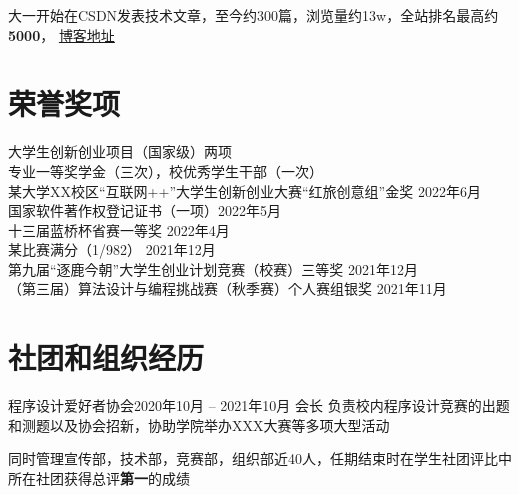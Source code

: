 \documentclass[a4paper]{article}
\begin{document}
{    大一开始在CSDN发表技术文章，至今约300篇，浏览量约13w，全站排名最高约\textbf{5000}， \href{https://blog.csdn.net}{博客地址}


\section{\textbf{荣誉奖项}}

    \textbullet 大学生创新创业项目（国家级）两项 \\
    \textbullet 专业一等奖学金（三次），校优秀学生干部（一次） \\
    \textbullet 某大学XX校区“互联网++”大学生创新创业大赛“红旅创意组”金奖 \hfill 2022年6月 \\
    \textbullet 国家软件著作权登记证书（一项）\hfill 2022年5月 \\
    \textbullet 十三届蓝桥杯省赛一等奖 \hfill 2022年4月 \\
    \textbullet 某比赛满分（1/982） \hfill 2021年12月 \\
    \textbullet 第九届“逐鹿今朝”大学生创业计划竞赛（校赛）三等奖 \hfill 2021年12月 \\
    \textbullet （第三届）算法设计与编程挑战赛（秋季赛）个人赛组银奖 \hfill 2021年11月

\ignorespaces


\section{\textbf{社团和组织经历}}
    
    \resumeTable
    {程序设计爱好者协会}{2020年10月 -- 2021年10月}
    {会长}{}
    负责校内程序设计竞赛的出题和测题以及协会招新，协助学院举办XXX大赛等多项大型活动

    \vspace{2pt} 同时管理宣传部，技术部，竞赛部，组织部近40人，任期结束时在学生社团评比中所在社团获得总评\textbf{第一}的成绩 



}
\end{document}
